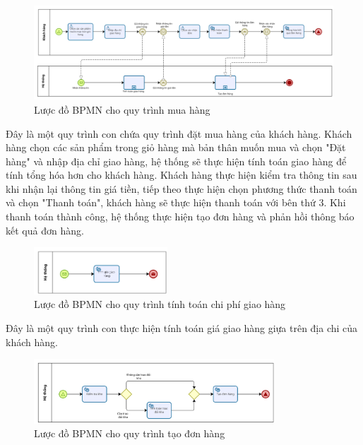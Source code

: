 \begin{figure}[!htp]
	\centering
	\includegraphics[width=17cm]{img/BPMN/customer_buy/customer_buy_order.png}
	\newline
	\caption{Lược đồ BPMN cho quy trình mua hàng}
\end{figure}

Đây là một quy trình con chứa quy trình đặt mua hàng của khách hàng. Khách hàng chọn các sản phẩm trong giỏ hàng mà bản thân muốn mua và chọn "Đặt hàng" và nhập địa chỉ giao hàng, hệ thống sẽ thực hiện tính toán giao hàng để tính tổng hóa hơn cho khách hàng. Khách hàng thực hiện kiểm tra thông tin sau khi nhận lại thông tin giá tiền, tiếp theo thực hiện chọn phương thức thanh toán và chọn "Thanh toán", khách hàng sẽ thực hiện thanh toán với bên thứ 3. Khi thanh toán thành công, hệ thống thực hiện tạo đơn hàng và phản hồi thông báo kết quả đơn hàng.

\begin{figure}[!htp]
	\centering
	\includegraphics[width=5cm]{img/BPMN/customer_buy/customer_calc_fee.png}
	\newline
	\caption{Lược đồ BPMN cho quy trình tính toán chi phí giao hàng}
\end{figure}

Đây là một quy trình con thực hiện tính toán giá giao hàng giựa trên địa chi của khách hàng.

\begin{figure}[!htp]
	\centering
	\includegraphics[width=9cm]{img/BPMN/customer_buy/customer_payment.png}
	\newline
	\caption{Lược đồ BPMN cho quy trình tạo đơn hàng}
\end{figure}

